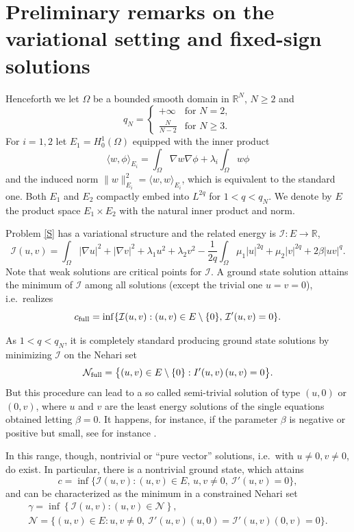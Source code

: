 \documentclass[reqno]{amsart}
\begin{document}
\section{Preliminary remarks on the variational setting and fixed-sign
solutions}\label{sec1}

Henceforth we let $\Omega$ be a bounded smooth domain in $\mathbb{R}^N$, $N\ge 2$ and
\[
q_N= \begin{cases} +\infty & \text{for } N=2,\\
\frac{N}{N-2} &\text{for } N\ge 3 .
\end{cases}
\]
For $i=1,2$ let $E_1=H^1_0(\Omega)$ equipped with the inner product
\[
\langle w,\phi \rangle_{E_i}
= \int_{\Omega} \nabla w \nabla \phi  +\lambda_i \int_{\Omega} w \phi
 \]
and the induced norm $ \|w\|_{E_i}^2=\langle w,w\rangle_{E_i}$,
which is equivalent to the standard one.
Both $E_1$ and $E_2$ compactly embed into $L^{2q}$ for $1<q<q_N$.
We denote by  $E$ the product space $E_1\times E_2$ with the natural inner product
and norm.

Problem \eqref{S} has a variational structure and the related energy is
$\mathcal I: E \to \mathbb{R}$,
\begin{equation} \label{energy}
\mathcal{I}(u,v) = \int_{\Omega} |\nabla u|^2 + | \nabla v|^2 + \lambda_1 u^2
+ \lambda_2 v^2   - \frac{1}{2q}\int_{\Omega} \mu_1 |u|^{2q}
+ \mu_2 |v|^{2q} + 2\beta |uv|^q .
\end{equation}
Note that weak solutions are critical points for $\mathcal I$.
A ground state solution attains the minimum of $\mathcal I$ among all solutions
(except the trivial one $u=v=0$), i.e.\ realizes
\[
c_{\rm full}=\inf\{ \mathcal I(u,v)  :  (u,v)\in E\setminus\{0\}, \,
 \mathcal I'(u,v)=0\}.
 \]

As $1< q< q_N$, it is completely standard producing ground state solutions by
minimizing $\mathcal I$ on the Nehari set
\begin{equation}\label{def:Nehari0}
 {\mathcal N}_{\rm full} = \big\{ (u,v)\in E\setminus\{0\} :
   I'(u,v) \, (u,v) =0 \big\}.
\end{equation}
But this procedure can lead to a so called semi-trivial solution of type
$(u,0)$ or $(0,v)$, where $u$ and $v$ are the least energy  solutions of the
single equations obtained letting $\beta=0$.
It happens, for instance, if the parameter $\beta$ is negative or positive but small,
see for instance \cite{BW_JDE06}.

In this range, though, nontrivial or ``pure vector'' solutions, i.e.\
 with $u\neq 0, v\neq 0$, do exist.
In particular, there is a nontrivial ground state, which attains
\begin{equation}\label{def:c}
  c=\inf\{ \mathcal I(u,v) : (u,v)\in E, \, u, v \neq 0,  \ \mathcal I'(u,v)=0\} ,
\end{equation}
and can be characterized as the minimum in a constrained Nehari set
\begin{gather} \label{def:gamma}
 \gamma= \inf\left\{ \mathcal I(u,v) : (u,v)\in \mathcal N\right\} , \\
\label{def:Neharivec}
\mathcal N=   \{ (u,v)\in E: u,v\neq 0, \ \mathcal I'(u,v)(u,0)= \mathcal I'(u,v)
(0,v)=0 \}.
\end{gather}
\end{document}
